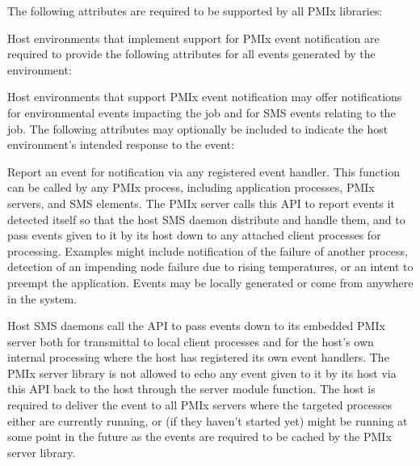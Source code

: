 \reqattrstart
The following attributes are required to be supported by all \ac{PMIx} libraries:


\divider

Host environments that implement support for \ac{PMIx} event notification are required to provide the following attributes for all events generated by the environment:


\reqattrend

\optattrstart
Host environments that support \ac{PMIx} event notification may offer notifications for environmental events impacting the job and for \ac{SMS} events relating to the job. The following attributes may optionally be included to indicate the host environment's intended response to the event:


\optattrend

\descr

Report an event for notification via any registered event handler. This function can be called by any \ac{PMIx} process, including application processes, \ac{PMIx} servers, and \ac{SMS} elements. The \ac{PMIx} server calls this \ac{API} to report events it detected itself so that the host \ac{SMS} daemon distribute and handle them, and to pass events given to it by its host down to any attached client processes for processing. Examples might include notification of the failure of another process, detection of an impending node failure due to rising temperatures, or an intent to preempt the application. Events may be locally generated or come from anywhere in the system.

Host \ac{SMS} daemons call the \ac{API} to pass events down to its embedded \ac{PMIx} server both for transmittal to local client processes and for the host's own internal processing where the host has registered its own event handlers. The \ac{PMIx} server library is not allowed to echo any event given to it by its host via this \ac{API} back to the host through the  server module function. The host is required to deliver the event to all \ac{PMIx} servers where the targeted processes either are currently running, or (if they haven't started yet) might be running at some point in the future as the events are required to be cached by the \ac{PMIx} server library.

